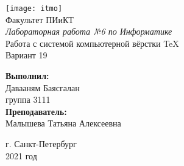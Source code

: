 \thispagestyle{empty}
\begin{center}
\texttt{[image: itmo]}\\
Факультет ПИиКТ\\
\vspace{5cm}
{\LARGE \textit {Лабораторная работа №6 по Информатике} \\
Работа с системой компьютерной вёрстки \TeX\\}
\Large Вариант 19
\end{center}
\vspace{3cm}
\begin{FlushRight}
{\large \textbf {Выполнил:}\\
Давааням Баясгалан\\
группа 3111\\
\textbf {Преподаватель:}\\
Малышева Татьяна Алексеевна\\
}
\end{FlushRight}
\vspace{4cm}
\begin{center}
г. Санкт-Петербург\\
2021 год
\end{center}